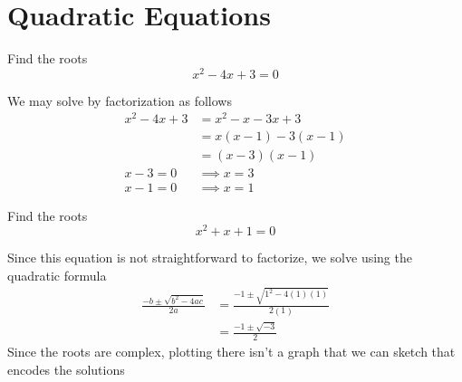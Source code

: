 \documentclass[a4paper]{article}
\begin{document}
\section{Quadratic Equations}

\begin{question}{}{}
Find the roots
\[
x^2 - 4x + 3 = 0
\]
\end{question}
We may solve by factorization as follows
\begin{align*}
x^2 -4x +3  &= x^2 -x -3x +3 \\
    &=x(x-1) - 3(x-1) \\
    &= (x-3)(x-1) \\
x-3 = 0 &\implies x=3 \\
x-1 = 0 &\implies x=1
\end{align*}

	\begin{center}

	\end{center}


\begin{question}{}{}
Find the roots
\[
x^2 + x + 1 = 0
\]
\end{question}
Since this equation is not straightforward to factorize, we solve using the quadratic formula
\begin{align*}
\frac{-b \pm \sqrt{b^2 - 4ac}}{2a} &= \frac{-1 \pm \sqrt{1^2 - 4(1)(1)}}{2(1)} \\
    &= \frac{-1 \pm \sqrt{-3}}{2}
\end{align*}
Since the roots are complex, plotting there isn't a graph that we can sketch that encodes the solutions
\end{document}
